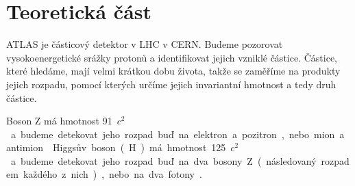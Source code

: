 \section*{Teoretická část}
ATLAS je částicový detektor v LHC v CERN. Budeme pozorovat vysokoenergetické srážky protonů a identifikovat jejich vzniklé částice.
Částice, které hledáme, mají velmi krátkou dobu života, takže se zaměříme na produkty jejich rozpadu, pomocí kterých určíme jejich invariantní hmotnost a tedy druh částice.

Boson Z má hmotnost \SI{91}{\GeV\per $c^2$} a budeme detekovat jeho rozpad buď na elektron a pozitron, nebo mion a antimion \cite{skripta}.

Higgsův boson (H) má hmotnost \SI{125}{\GeV\per $c^2$} a budeme detekovat jeho rozpad buď na dva bosony Z (následovaný rozpadem každého z nich), nebo na dva fotony \cite{skripta}.

